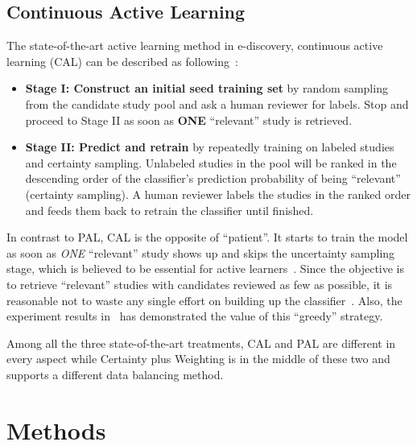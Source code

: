 \documentclass{svjour3}
\theoremstyle{break}
\begin{document}
\subsection{Continuous Active Learning}
\label{sect: Continuous Active Learning}

The state-of-the-art active learning method in e-discovery, continuous active learning (CAL) can be described as following~\cite{cormack2014evaluation,cormack2015autonomy,tredennick2015}:

\begin{itemize}

\item
{\bf Stage I: Construct an initial seed training set} by random sampling from the candidate study pool and ask a human reviewer for labels. Stop and proceed to Stage II as soon as \textbf{ONE} ``relevant'' study is retrieved.

\item
{\bf Stage II: Predict and retrain} by repeatedly training on labeled studies and certainty sampling. Unlabeled studies in the pool will be ranked in the descending order of the classifier's prediction probability of being ``relevant'' (certainty sampling). A human reviewer labels the studies in the ranked order and feeds them back to retrain the classifier until finished.

\end{itemize}

In contrast to PAL, CAL is the opposite of ``patient''. It starts to train the model as soon as \textit{ONE} ``relevant'' study shows up and skips the uncertainty sampling stage, which is believed to be essential for active learners~\cite{settles2012active}. Since the objective is to retrieve ``relevant'' studies with candidates reviewed as few as possible, it is reasonable not to waste any single effort on building up the classifier~\cite{cormack2014evaluation,tredennick2015}. Also, the experiment results in~\cite{cormack2014evaluation} has demonstrated the value of this ``greedy'' strategy.

Among all the three state-of-the-art treatments, CAL and PAL are different in every aspect while Certainty plus Weighting is in the middle of these two and supports a different data balancing method.


\section{Methods}
\label{sect: Method}
\end{document}
